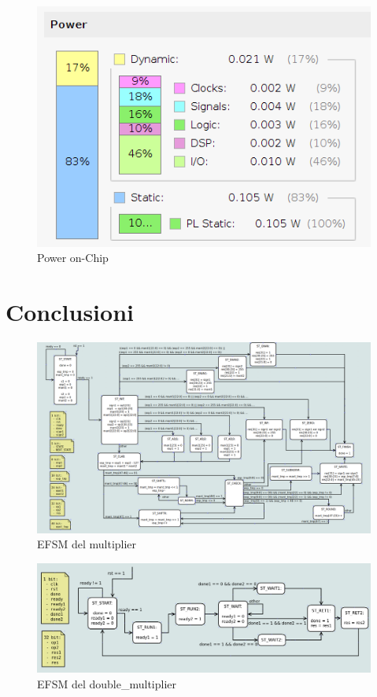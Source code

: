 \documentclass[]{IEEEtran}
\begin{document}
\begin{figure}[!htb]
    \centering
    \includegraphics[width=0.9\linewidth]{figures/power_onChip}
    \caption{Power on-Chip}
    \label{fig:POWER_ONCHIP}
\end{figure}


\section{Conclusioni}

\nocite{*}


\appendix

\begin{figure}[bt]
    \centering
    \includegraphics[width=\textwidth]{figures/EFSM_mult}
    \caption{EFSM del multiplier}
    \label{fig:EFSM_MULT}
\end{figure}

\begin{figure}[bt]
    \centering
    \includegraphics[width=\textwidth]{figures/EFSM_dm}
    \caption{EFSM del double\_multiplier}
    \label{fig:EFSM_DM}
\end{figure}
\end{document}
